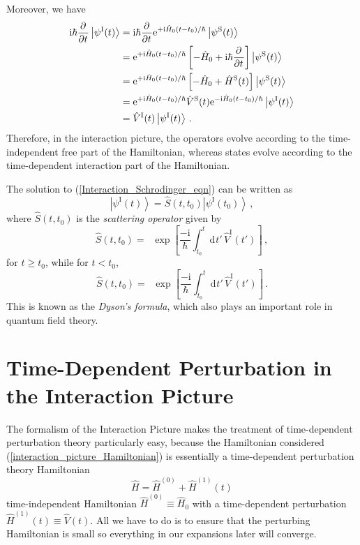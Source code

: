 \documentclass{article}
\theoremstyle{plain}\theoremheaderfont{\normalfont\itshape}\theorembodyfont{\rmfamily}\theoremseparator{.}\newtheorem*{rem}{Remark}\newtheorem*{ex}{Example}\newtheorem*{proof}{Proof}\newtheorem*{altp}{Alternative proof}
\theoremstyle{plain}\theoremheaderfont{\normalfont\bfseries}\theorembodyfont{\rmfamily}\theoremseparator{.}\newtheorem{thm}{Theorem}[section]\newtheorem{lem}[thm]{Lemma}\newtheorem{prop}[thm]{Proposition}\newtheorem*{cor}{Corollary}\newtheorem{defn}[thm]{Definition}\newtheorem{clm}[thm]{Claim}\newtheorem{clminproof}{Claim}
\theoremstyle{break}\theoremheaderfont{\normalfont\itshape}\theorembodyfont{\rmfamily}\theoremseparator{.\medskip}\newtheorem*{proofskip}{Proof}\newtheorem*{exs}{Examples}\newtheorem*{rems}{Remarks}
\theoremstyle{break}\theoremheaderfont{\normalfont\bfseries}\theorembodyfont{\rmfamily}\theoremseparator{.\medskip}\newtheorem{lemskip}[thm]{Lemma}\newtheorem{defnskip}[thm]{Definition}\newtheorem{propskip}[thm]{Proposition}\newtheorem{thmskip}[thm]{Theorem}
\numberwithin{equation}{section}
\newcommand{\ii}{\mathrm{i}}
\newcommand{\ee}{\mathrm{e}}
\newcommand{\dd}[2][]{\mathrm{d}^{#1} #2\,}
\newcommand{\pdv}[3][]{\frac{\partial^{#1} #2}{{\partial #3}^{#1}}}
\newcommand{\ket}[1]{\left| #1 \right\rangle}
\DeclareMathOperator{\tord}{\overleftarrow{\mathcal{T}}}
\DeclareMathOperator{\trev}{\overrightarrow{\mathcal{T}}}
\newcommand{\Sch}{^{\mathrm{S}}}
\newcommand{\Int}{^{\mathrm{I}}}
\begin{document}
    Moreover, we have
    \begin{align}
        \ii\hbar\pdv{}{t}\ket{\psi\Int(t)}&=\ii\hbar\pdv{}{t}\ee^{+\ii\hat{H}_0(t-t_0)/\hbar}\ket{\psi\Sch(t)}\notag \\
        &=\ee^{+\ii\hat{H}_0(t-t_0)/\hbar}\left[-\hat{H}_0+\ii\hbar\pdv{}{t}\right]\ket{\psi\Sch(t)}\notag \\
        &=\ee^{+\ii\hat{H}_0(t-t_0)/\hbar}\left[-\hat{H}_0+\hat{H}\Sch(t)\right]\ket{\psi\Sch(t)}\notag \\
        &=\ee^{+\ii\hat{H}_0(t-t_0)/\hbar}\hat{V}\Sch(t)\ee^{-\ii\hat{H}_0(t-t_0)/\hbar}\ket{\psi\Int(t)}\notag \\
        &=\hat{V}\Int(t)\ket{\psi\Int(t)}\,. \label{Interaction_Schrodinger_eqn}
    \end{align}
    Therefore, in the interaction picture, the operators evolve according to the time-independent free part of the Hamiltonian, whereas states evolve according to the time-dependent interaction part of the Hamiltonian.

    The solution to (\ref{Interaction_Schrodinger_eqn}) can be written as
    \begin{equation}
        \ket{\psi\Int(t)}=\hat{S}(t,t_0)\ket{\psi\Int(t_0)}\,,
    \end{equation}
    where \(\hat{S}(t,t_0)\) is the \textit{scattering operator} given by
    \begin{equation}
        \hat{S}(t,t_0)=\tord\exp\left[\frac{-\ii}{\hbar}\int_{t_0}^{t}\dd{t'}\hat{V}\Int(t')\right]\,,
    \end{equation}
    for \(t\ge t_0\), while for \(t<t_0\),
    \begin{equation}
        \hat{S}(t,t_0)=\trev\exp\left[\frac{-\ii}{\hbar}\int_{t_0}^{t}\dd{t'}\hat{V}\Int(t')\right]\,.
    \end{equation}
    This is known as the \textit{Dyson's formula}, which also plays an important role in quantum field theory. 

    
    \section{Time-Dependent Perturbation in the Interaction Picture}

    The formalism of the Interaction Picture makes the treatment of time-dependent perturbation theory particularly easy, because the Hamiltonian considered (\ref{interaction_picture_Hamiltonian}) is essentially a time-dependent perturbation theory Hamiltonian
    \begin{equation}
        \hat{H}=\hat{H}^{(0)}+\hat{H}^{(1)}(t)
    \end{equation}
    time-independent Hamiltonian \(\hat{H}^{(0)}\equiv\hat{H}_0\) with a time-dependent perturbation \(\hat{H}^{(1)}(t)\equiv\hat{V}(t)\). All we have to do is to ensure that the perturbing Hamiltonian is small so everything in our expansions later will converge.
\end{document}
